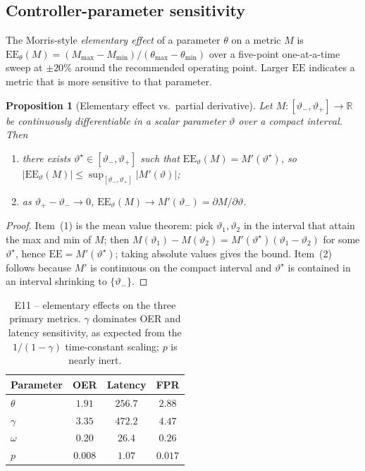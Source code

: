 \documentclass[sigconf,anonymous]{acmart}
\theoremstyle{plain}
\newtheorem{proposition}{Proposition}
\theoremstyle{definition}
\theoremstyle{remark}
\begin{document}
\subsection{Controller-parameter sensitivity}
\label{app:w11}
The Morris-style \emph{elementary effect} of a parameter $\theta$ on a
metric $M$ is
$\mathrm{EE}_\theta(M)=(M_{\max}-M_{\min})/(\theta_{\max}-\theta_{\min})$
over a five-point one-at-a-time sweep at $\pm20\%$ around the
recommended operating point.  Larger $\mathrm{EE}$ indicates a metric
that is more sensitive to that parameter.

\begin{proposition}[Elementary effect vs.\ partial derivative]
\label{prop:w11}
Let $M:[\vartheta_-,\vartheta_+]\to\mathbb{R}$ be continuously
differentiable in a scalar parameter $\vartheta$ over a compact
interval.  Then
\begin{enumerate}[leftmargin=1.2em,topsep=1pt,itemsep=1pt]
\item there exists $\vartheta^\star\in[\vartheta_-,\vartheta_+]$ such
  that $\mathrm{EE}_\vartheta(M)=M'(\vartheta^\star)$, so
  $|\mathrm{EE}_\vartheta(M)|\le\sup_{[\vartheta_-,\vartheta_+]}
  |M'(\vartheta)|$;
\item as $\vartheta_+-\vartheta_-\to 0$,
  $\mathrm{EE}_\vartheta(M)\to M'(\vartheta_-)=
  \partial M/\partial\vartheta$.
\end{enumerate}
\end{proposition}

\begin{proof}
Item~(1) is the mean value theorem: pick $\vartheta_1,\vartheta_2$ in
the interval that attain the max and min of $M$; then
$M(\vartheta_1)-M(\vartheta_2)=M'(\vartheta^\star)(\vartheta_1-
\vartheta_2)$ for some $\vartheta^\star$, hence $\mathrm{EE}=M'(\vartheta^
\star)$; taking absolute values gives the bound.  Item~(2) follows
because $M'$ is continuous on the compact interval and $\vartheta^\star$
is contained in an interval shrinking to $\{\vartheta_-\}$.
\end{proof}

\begin{table}[h]
\caption{E11 -- elementary effects on the three primary metrics.
$\gamma$ dominates OER and latency sensitivity, as expected from the
$1/(1-\gamma)$ time-constant scaling; $p$ is nearly inert.}
\label{tab:w11}
\centering\footnotesize\renewcommand{\arraystretch}{1.22}
\begin{tabular}{p{1.3cm} c c c}
\toprule
\rowcolor{headrow}
{\color{white}\textbf{Parameter}} & {\color{white}\textbf{OER}} &
{\color{white}\textbf{Latency}} & {\color{white}\textbf{FPR}}\\
\midrule
$\theta$ & $1.91$ & $256.7$ & $2.88$\\
\rowcolor{oursrow}
$\gamma$ & $3.35$ & $472.2$ & $4.47$\\
$\omega$ & $0.20$ & $26.4$ & $0.26$\\
$p$ & $0.008$ & $1.07$ & $0.017$\\
\bottomrule
\end{tabular}
\end{table}
\end{document}
